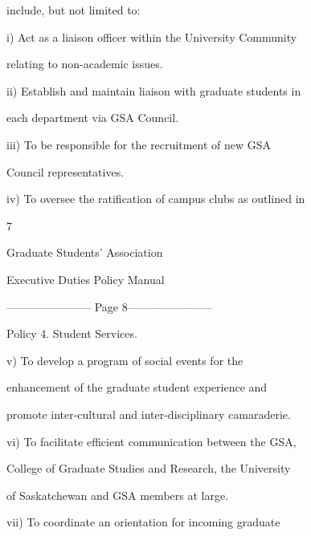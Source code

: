          include, but not limited to:   

  

         i)       Act as a liaison officer within the University Community  

                  relating to non-academic issues.  

  

         ii)      Establish and maintain liaison with graduate students in  

                  each department via GSA Council.   

  

  

         iii)     To  be  responsible  for  the  recruitment  of  new  GSA  

                  Council representatives.   

  

         iv)      To oversee the ratification of campus clubs as outlined in  



                                                 7  

                                     

                                   Graduate Students’ Association  

                                  Executive Duties Policy Manual  

  


----------------------- Page 8-----------------------

                  Policy 4. Student Services.   

  

         v)       To     develop       a    program       of    social      events      for    the  

                  enhancement  of  the   graduate  student  experience  and  

                  promote inter-cultural and inter-disciplinary camaraderie.   

  

         vi)      To facilitate efficient communication between the GSA,  

                  College of Graduate Studies and Research, the University  

                  of Saskatchewan and GSA members at large.   

  

         vii)     To   coordinate   an   orientation   for   incoming   graduate  



